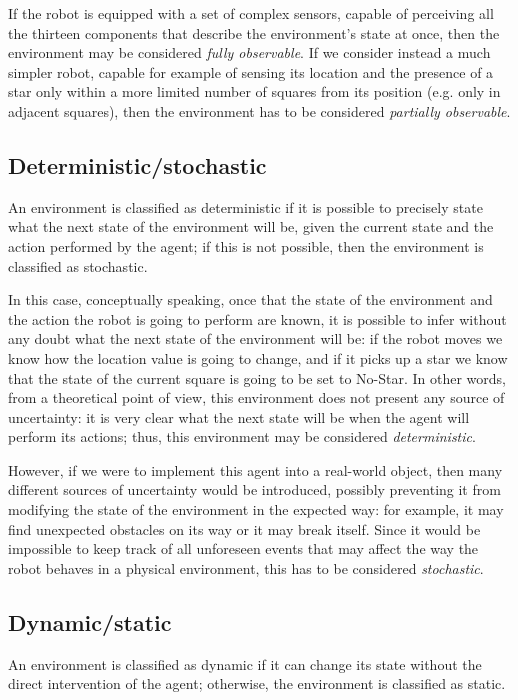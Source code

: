 \documentclass[letterpaper,headings=standardclasses]{scrartcl}
\begin{document}
If the robot is equipped with a set of complex sensors, capable of perceiving all the thirteen components that describe the environment's state at once, then the environment may be considered \emph{fully observable}. If we consider instead a much simpler robot, capable for example of sensing its location and the presence of a star only within a more limited number of squares from its position (e.g. only in adjacent squares), then the environment has to be considered \emph{partially observable}.

\subsection{Deterministic/stochastic}

An environment is classified as deterministic if it is possible to precisely state what the next state of the environment will be, given the current state and the action performed by the agent; if this is not possible, then the environment is classified as stochastic.

In this case, conceptually speaking, once that the state of the environment and the action the robot is going to perform are known, it is possible to infer without any doubt what the next state of the environment will be: if the robot moves we know how the location value is going to change, and if it picks up a star we know that the state of the current square is going to be set to No-Star. In other words, from a theoretical point of view, this environment does not present any source of uncertainty: it is very clear what the next state will be when the agent will perform its actions; thus, this environment may be considered \emph{deterministic}.

However, if we were to implement this agent into a real-world object, then many different sources of uncertainty would be introduced, possibly preventing it from modifying the state of the environment in the expected way: for example, it may find unexpected obstacles on its way or it may break itself. Since it would be impossible to keep track of all unforeseen events that may affect the way the robot behaves in a physical environment, this has to be considered \emph{stochastic}.

\subsection{Dynamic/static}

An environment is classified as dynamic if it can change its state without the direct intervention of the agent; otherwise, the environment is classified as static.
\end{document}
